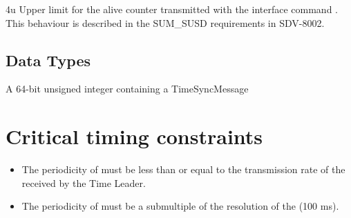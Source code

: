 {
{4u}
{Upper limit for the alive counter transmitted with the  interface command .
This behaviour is described in the SUM_SUSD requirements in SDV-8002.}}
{}

\subsection{Data Types}
\label{sec:data_types}

{}
{A 64-bit unsigned integer containing a TimeSyncMessage}







\section{Critical timing constraints}
\begin{itemize}
\item The periodicity of  must be less than or equal to the transmission rate of the  received by the Time Leader.
\item The periodicity of  must be a submultiple of the resolution of the  (100 ms).
\end{itemize}

